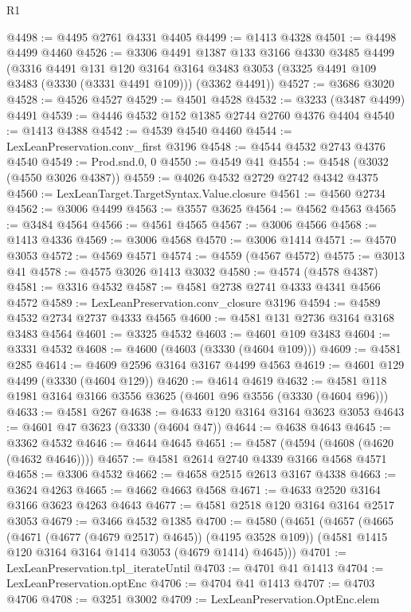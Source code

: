 \begin{lexlean}{R1}
\begin{coremodule}
@4498 := @4495 @2761 @4331 @4405
@4499 := @1413 @4328
@4501 := @4498 @4499 @4460
@4526 := @3306
    @4491
    @1387
    @133
    @3166
    @4330
    @3485
    @4499
    (@3316
      @4491
      @131
      @120
      @3164
      @3164
      @3483
      @3053
      (@3325 @4491 @109 @3483 (@3330 (@3331 @4491 @109)))
      (@3362 @4491))
@4527 := @3686 @3020
@4528 := @4526 @4527
@4529 := @4501 @4528
@4532 := @3233 (@3487 @4499) @4491
@4539 := @4446 @4532 @152 @1385 @2744 @2760 @4376 @4404
@4540 := @1413 @4388
@4542 := @4539 @4540 @4460
@4544 := LexLeanPreservation.conv_first @3196
@4548 := @4544 @4532 @2743 @4376 @4540
@4549 := Prod.snd.{0, 0}
@4550 := @4549 @41
@4554 := @4548 (@3032 (@4550 @3026 @4387))
@4559 := @4026 @4532 @2729 @2742 @4342 @4375
@4560 := LexLeanTarget.TargetSyntax.Value.closure
@4561 := @4560 @2734
@4562 := @3006 @4499
@4563 := @3557 @3625
@4564 := @4562 @4563
@4565 := @3484 @4564
@4566 := @4561 @4565
@4567 := @3006 @4566
@4568 := @1413 @4336
@4569 := @3006 @4568
@4570 := @3006 @1414
@4571 := @4570 @3053
@4572 := @4569 @4571
@4574 := @4559 (@4567 @4572)
@4575 := @3013 @41
@4578 := @4575 @3026 @1413 @3032
@4580 := @4574 (@4578 @4387)
@4581 := @3316 @4532
@4587 := @4581 @2738 @2741 @4333 @4341 @4566 @4572
@4589 := LexLeanPreservation.conv_closure @3196
@4594 := @4589 @4532 @2734 @2737 @4333 @4565
@4600 := @4581 @131 @2736 @3164 @3168 @3483 @4564
@4601 := @3325 @4532
@4603 := @4601 @109 @3483
@4604 := @3331 @4532
@4608 := @4600 (@4603 (@3330 (@4604 @109)))
@4609 := @4581 @285
@4614 := @4609 @2596 @3164 @3167 @4499 @4563
@4619 := @4601 @129 @4499 (@3330 (@4604 @129))
@4620 := @4614 @4619
@4632 := @4581 @118 @1981 @3164 @3166 @3556 @3625 (@4601 @96 @3556 (@3330 (@4604 @96)))
@4633 := @4581 @267
@4638 := @4633 @120 @3164 @3164 @3623 @3053
@4643 := @4601 @47 @3623 (@3330 (@4604 @47))
@4644 := @4638 @4643
@4645 := @3362 @4532
@4646 := @4644 @4645
@4651 := @4587 (@4594 (@4608 (@4620 (@4632 @4646))))
@4657 := @4581 @2614 @2740 @4339 @3166 @4568 @4571
@4658 := @3306 @4532
@4662 := @4658 @2515 @2613 @3167 @4338
@4663 := @3624 @4263
@4665 := @4662 @4663 @4568
@4671 := @4633 @2520 @3164 @3166 @3623 @4263 @4643
@4677 := @4581 @2518 @120 @3164 @3164 @2517 @3053
@4679 := @3466 @4532 @1385
@4700 := @4580
    (@4651
      (@4657
        (@4665 (@4671 (@4677 (@4679 @2517) @4645)) (@4195 @3528 @109))
        (@4581 @1415 @120 @3164 @3164 @1414 @3053 (@4679 @1414) @4645)))
@4701 := LexLeanPreservation.tpl_iterateUntil
@4703 := @4701 @41 @1413
@4704 := LexLeanPreservation.optEnc
@4706 := @4704 @41 @1413
@4707 := @4703 @4706
@4708 := @3251 @3002
@4709 := LexLeanPreservation.OptEnc.elem

\end{coremodule}
\end{lexlean}
